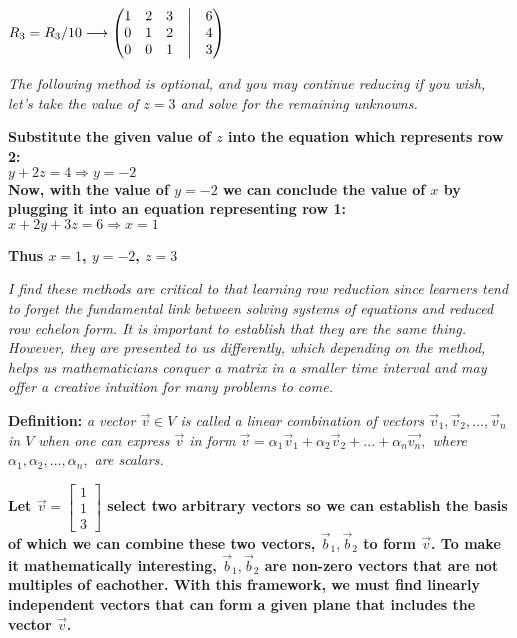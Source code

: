 \documentclass{article}
\begin{document}
	\textbf{$R_{{3}} = R_{{3}}/10 \longrightarrow \begin{pmatrix}
			1 & 2 & 3 &\bigm| & 6 \\
			0 & 1 & 2 &\bigm| & 4 \\
			0 & 0 & 1 &\bigm| & 3 \end{pmatrix}$}
		
	\textit{The following method is optional, and you may continue reducing if you wish, let's take the value of $z = 3$ and solve for the remaining unknowns.}
	
	\clearpage
	
	
	\textbf{Substitute the given value of $z$ into the equation which represents row 2:\\$y + 2z = 4 \Longrightarrow y = -2$ \\ Now, with the value of $y = -2$ we can conclude the value of $x$ by plugging it into an equation representing row 1:\\ $x + 2y + 3z = 6 \Longrightarrow x = 1$} %
	
	\textbf{Thus $x=1$, $y=-2$, $z=3$} %
	
	\textit{I find these methods are critical to that learning row reduction since learners tend to forget the fundamental link between solving systems of equations and reduced row echelon form. It is important to establish that they are the same thing. However, they are presented to us differently, which depending on the method, helps us mathematicians conquer a matrix in a smaller time interval and may offer a creative intuition for many problems to come.}
	
	
	\textbf{Definition:}
	\textit{a vector $\Vec{v} \in V$ is called a linear combination of vectors $\vec{v}_{{1}}, \vec{v}_{{2}}, ..., \vec{v}_{{n}}$ in $V$  when one can express $\vec{v}$ in form $\vec{v} = \alpha_{{1}}\vec{v}_{{1}} + \alpha_{{2}}\Vec{v}_{{2}} + ... + \alpha_{{n}}\Vec{v_{{n}}},$ where $\alpha_{{1}}, \alpha_{{2}}, ..., \alpha_{{n}}, $ are scalars.} %
	
	
	\textbf{Let $\vec{v} = \begin{bmatrix}
			1 \\
			1 \\
			3
		\end{bmatrix}$ select two arbitrary vectors so we can establish the basis of which we can combine these two vectors, $\Vec{b}_{1}, \Vec{b}_{2}$ to form $\Vec{v}$. To make it mathematically interesting, $\Vec{b}_{1}, \Vec{b}_{2}$ are non-zero vectors that are not multiples of eachother. With this framework, we must find linearly independent vectors that can form a given plane that includes the vector $\vec{v}$. }
	
\end{document}
